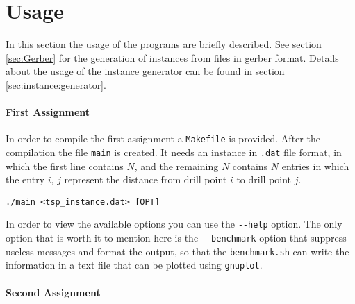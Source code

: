 \section{Usage}
In this section the usage of the programs are briefly described.
See section \ref{sec:Gerber} for the generation of instances from files in gerber format.
Details about the usage of the instance generator can be found in section \ref{sec:instance:generator}.
\paragraph{First Assignment}
In order to compile the first assignment a \verb|Makefile| is provided.
After the compilation the file \verb|main| is created. It needs an instance
in \verb|.dat| file format, in which the first line contains $N$, and the 
remaining $N$ contains $N$ entries in which the entry $i$, $j$ represent the distance
from drill point $i$ to drill point $j$.
\begin{verbatim}
./main <tsp_instance.dat> [OPT]
\end{verbatim}
In order to view the available options you can use the \verb|--help|  option.
The only option that is worth it to mention here is the \verb|--benchmark| option that
suppress useless messages and format the output, so that the \verb|benchmark.sh| can write
the information in a text file that can be plotted using \verb|gnuplot|.

\paragraph{Second Assignment}
 